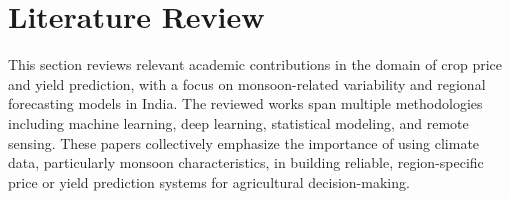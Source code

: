 \section[Literature Review]{\textbf{Literature Review}}

This section reviews relevant academic contributions in the domain of crop price and yield prediction, with a focus on monsoon-related variability and regional forecasting models in India. The reviewed works span multiple methodologies including machine learning, deep learning, statistical modeling, and remote sensing. These papers collectively emphasize the importance of using climate data, particularly monsoon characteristics, in building reliable, region-specific price or yield prediction systems for agricultural decision-making.

